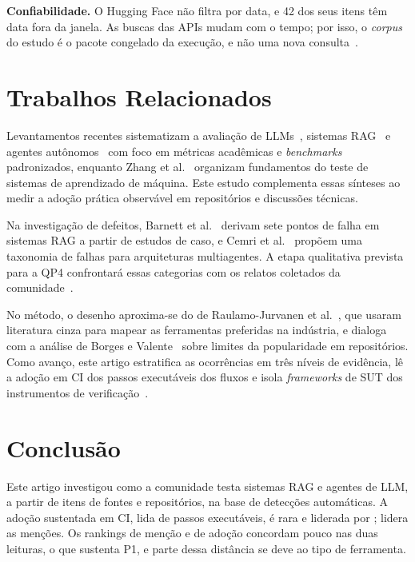 \documentclass[sigconf]{acmart}
\newcommand{\ColForaJanela}{42}          %
\begin{document}
\textbf{Confiabilidade.} O Hugging Face não filtra por data, e \ColForaJanela{} dos seus itens têm data fora da janela. As buscas das APIs mudam com o tempo; por isso, o \textit{corpus} do estudo é o pacote congelado da execução, e não uma nova consulta~\cite{msrkit2027}.

\section{Trabalhos Relacionados}
\label{sec:relacionados}

Levantamentos recentes sistematizam a avaliação de LLMs~\cite{chang2024survey}, sistemas RAG~\cite{yu2024ragsurvey} e agentes autônomos~\cite{yehudai2025agents} com foco em métricas acadêmicas e \textit{benchmarks} padronizados, enquanto Zhang et al.~\cite{zhang2022mltesting} organizam fundamentos do teste de sistemas de aprendizado de máquina. Este estudo complementa essas sínteses ao medir a adoção prática observável em repositórios e discussões técnicas.

Na investigação de defeitos, Barnett et al.~\cite{barnett2024seven} derivam sete pontos de falha em sistemas RAG a partir de estudos de caso, e Cemri et al.~\cite{cemri2025multiagent} propõem uma taxonomia de falhas para arquiteturas multiagentes. A etapa qualitativa prevista para a QP4 confrontará essas categorias com os relatos coletados da comunidade~\cite{cruzes2011thematic}.

No método, o desenho aproxima-se do de Raulamo-Jurvanen et al.~\cite{raulamo2017choosing}, que usaram literatura cinza para mapear as ferramentas preferidas na indústria, e dialoga com a análise de Borges e Valente~\cite{borges2018star} sobre limites da popularidade em repositórios. Como avanço, este artigo estratifica as ocorrências em três níveis de evidência, lê a adoção em CI dos passos executáveis dos fluxos e isola \textit{frameworks} de SUT dos instrumentos de verificação~\cite{kalliamvakou2014promises}.

\section{Conclusão}
\label{sec:conclusao}

Este artigo investigou como a comunidade testa sistemas RAG e agentes de LLM, a partir de \ResItens{} itens de \ResFontes{} fontes e \ResReposEnriquecidos{} repositórios, na base de detecções automáticas. A adoção sustentada em CI, lida de passos executáveis, é rara e liderada por \ResTopNTres; \ResTopNUm{} lidera as menções. Os rankings de menção e de adoção concordam pouco nas duas leituras, o que sustenta P1, e parte dessa distância se deve ao tipo de ferramenta.
\end{document}
